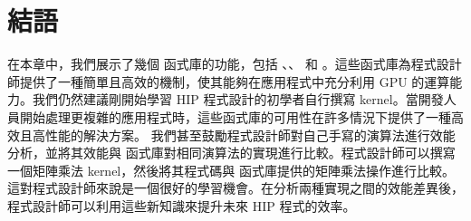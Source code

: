 \section{結語}
在本章中，我們展示了幾個  函式庫的功能，包括 、、 和 。這些函式庫為程式設計師提供了一種簡單且高效的機制，使其能夠在應用程式中充分利用 GPU 的運算能力。我們仍然建議剛開始學習 HIP 程式設計的初學者自行撰寫 kernel。當開發人員開始處理更複雜的應用程式時，這些函式庫的可用性在許多情況下提供了一種高效且高性能的解決方案。
我們甚至鼓勵程式設計師對自己手寫的演算法進行效能分析，並將其效能與  函式庫對相同演算法的實現進行比較。程式設計師可以撰寫一個矩陣乘法 kernel，然後將其程式碼與  函式庫提供的矩陣乘法操作進行比較。這對程式設計師來說是一個很好的學習機會。在分析兩種實現之間的效能差異後，程式設計師可以利用這些新知識來提升未來 HIP 程式的效率。